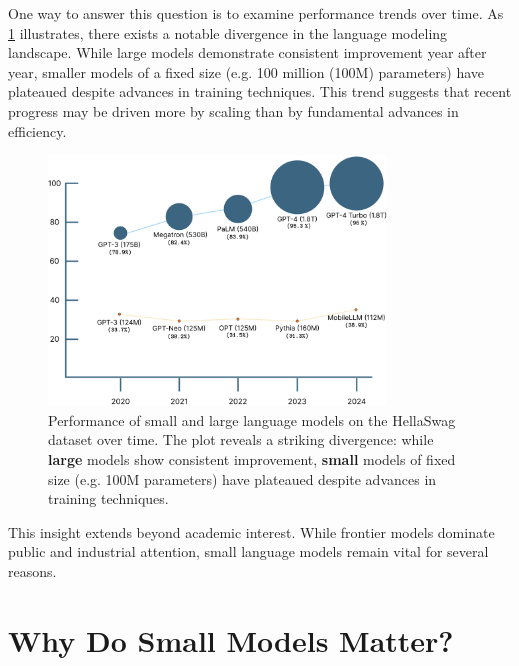 One way to answer this question is to examine performance trends over time. As \cref{fig:model_size_vs_performance} illustrates, there exists a notable divergence in the language modeling landscape. While large models demonstrate consistent improvement year after year, smaller models of a fixed size (e.g. 100 million (100M) parameters) have plateaued despite advances in training techniques. This trend suggests that recent progress may be driven more by scaling than by fundamental advances in efficiency.

\begin{figure}[htbp]
    \centering
    \includegraphics[width=0.8\textwidth]{chapters/introduction/figures/lm_performance_comparison.pdf}
    \caption{Performance of small and large language models on the HellaSwag dataset over time. The plot reveals a striking divergence: while \textbf{\textcolor[HTML]{37718E}{large}} models show consistent improvement, \textbf{\textcolor[HTML]{FF7F11}{small}} models of fixed size (e.g. 100M parameters) have plateaued despite advances in training techniques.}
    \label{fig:model_size_vs_performance}
\end{figure}

This insight extends beyond academic interest. While frontier models dominate public and industrial attention, small language models remain vital for several reasons. %

\section*{Why Do Small Models Matter?}

